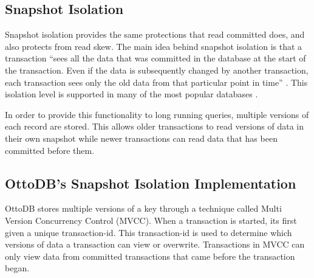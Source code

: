 \documentclass[conference]{IEEEtran}
\begin{document}
    \subsection{Snapshot Isolation}

    Snapshot isolation provides the same protections that read committed does, and also protects from read skew. The main idea behind snapshot isolation is that a transaction “sees all the data that was committed in the database at the start of the transaction. Even if the data is subsequently changed by another transaction, each transaction sees only the old data from that particular point in time” \cite[p. 238]{b18}. This isolation level is supported in many of the most popular databases \cite[p. 239]{b18}. 
    
    In order to provide this functionality to long running queries, multiple versions of each record are stored. This allows older transactions to read versions of data in their own snapshot while newer transactions can read data that has been committed before them.

    \subsection{OttoDB’s Snapshot Isolation Implementation}


    OttoDB stores multiple versions of a key through a technique called Multi Version Concurrency Control (MVCC). When a transaction is started, its first given a unique transaction-id. This transaction-id is used to determine which versions of data a transaction can view or overwrite. Transactions in MVCC can only view data from committed transactions that came before the transaction began.
    

\end{document}
